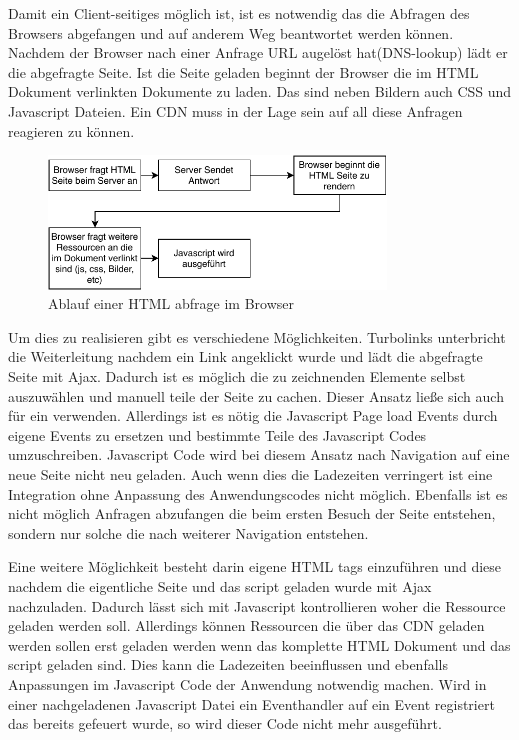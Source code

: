 Damit ein Client-seitiges \cdn möglich ist, ist es notwendig das die Abfragen des Browsers abgefangen und auf anderem Weg beantwortet werden können. Nachdem der Browser nach einer Anfrage URL augelöst hat(DNS-lookup) lädt er die abgefragte Seite. Ist die Seite geladen beginnt der Browser die im HTML Dokument verlinkten Dokumente zu laden. Das sind neben Bildern auch CSS und Javascript Dateien. Ein CDN muss in der Lage sein auf all diese Anfragen reagieren zu können.

\begin{figure}[!h]
	\centering
	\includegraphics[width=0.8\textwidth]{figures/browser_abfrage}
	\caption[A Figure Short-Title]{Ablauf einer HTML abfrage im Browser}
	\label{fig:browser_abfrage}
\end{figure}


Um dies zu realisieren gibt es verschiedene Möglichkeiten. Turbolinks unterbricht die Weiterleitung nachdem ein Link angeklickt wurde und lädt die abgefragte Seite mit Ajax. Dadurch ist es möglich die zu zeichnenden Elemente selbst auszuwählen und manuell teile der Seite zu cachen. Dieser Ansatz ließe sich auch für ein \cdn verwenden. Allerdings ist es nötig die Javascript Page load Events durch eigene Events zu ersetzen und bestimmte Teile des Javascript Codes umzuschreiben. Javascript Code wird bei diesem Ansatz nach Navigation auf eine neue Seite nicht neu geladen. Auch wenn dies die Ladezeiten verringert ist eine Integration ohne Anpassung des Anwendungscodes nicht möglich. Ebenfalls ist es nicht möglich Anfragen abzufangen die beim ersten Besuch der Seite entstehen, sondern nur solche die nach weiterer Navigation entstehen.

Eine weitere Möglichkeit besteht darin eigene HTML tags einzuführen und diese nachdem die eigentliche Seite und das \cdn script geladen wurde mit Ajax nachzuladen. Dadurch lässt sich mit Javascript kontrollieren woher die Ressource geladen werden soll. Allerdings können Ressourcen die über das \pTp CDN geladen werden sollen erst geladen werden wenn das komplette HTML Dokument und das \cdn script geladen sind. Dies kann die Ladezeiten beeinflussen und ebenfalls Anpassungen im Javascript Code der Anwendung notwendig machen. Wird in einer nachgeladenen Javascript Datei ein Eventhandler auf ein Event registriert das bereits gefeuert wurde, so wird dieser Code nicht mehr ausgeführt. 

